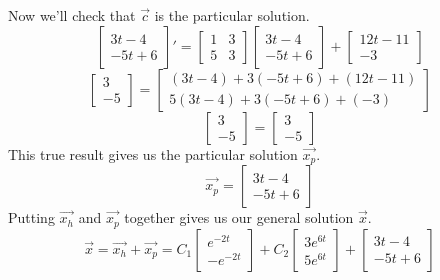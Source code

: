 Now we'll check that $\vec{c}$ is the particular solution.
\begin{equation*}
	\begin{bmatrix}
		3t-4 \\
		-5t+6
	\end{bmatrix}' = \begin{bmatrix}
		1 & 3 \\
		5 & 3
	\end{bmatrix} \begin{bmatrix}
		3t - 4 \\
		-5t + 6
	\end{bmatrix} + \begin{bmatrix}
		12t - 11 \\
		-3
	\end{bmatrix}
\end{equation*}
\begin{equation*}
	\begin{bmatrix}
		3 \\
		-5
	\end{bmatrix} = \begin{bmatrix}
		(3t-4) + 3(-5t+6) + (12t-11) \\
		5(3t-4) + 3(-5t+6) + (-3)
	\end{bmatrix}
\end{equation*}
\begin{equation*}
	\begin{bmatrix}
		3 \\
		-5
	\end{bmatrix} = \begin{bmatrix}
		3 \\
		-5
	\end{bmatrix}
\end{equation*}
This true result gives us the particular solution $\vec{x_p}$.
\begin{equation*}
	\vec{x_p} = \begin{bmatrix}
		3t - 4 \\
		-5t + 6
	\end{bmatrix}
\end{equation*}
Putting $\vec{x_h}$ and $\vec{x_p}$ together gives us our general solution $\vec{x}$.
\begin{equation*}
	\vec{x} = \vec{x_h} + \vec{x_p} = C_1\begin{bmatrix}
		e^{-2t} \\
		-e^{-2t}
	\end{bmatrix} + C_2\begin{bmatrix}
		3e^{6t} \\
		5e^{6t}
	\end{bmatrix} + \begin{bmatrix}
		3t - 4 \\
		-5t + 6
	\end{bmatrix}
\end{equation*}